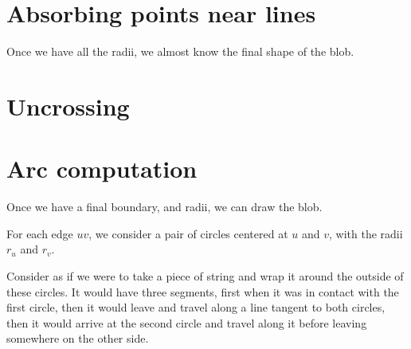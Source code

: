 \documentclass[paper=a4, fontsize=11pt]{scrartcl} %
\numberwithin{equation}{section} %
\numberwithin{figure}{section} %
\numberwithin{table}{section} %
\begin{document}
\section{Absorbing points near lines}
Once we have all the radii, we almost know the final shape of the blob.

\section{Uncrossing}

\section{Arc computation}
Once we have a final boundary, and radii, we can draw the blob.

For each edge $uv$, we consider a pair of circles centered at
$u$ and $v$, with the radii $r_u$ and $r_v$.

Consider as if we were to take a piece of string and wrap it around
the outside of these circles.
It would have three segments,
first when it was in contact with the first circle,
then it would leave and travel along a line tangent to both circles,
then it would arrive at the second circle
and travel along it before leaving somewhere on the other side.




\end{document}
